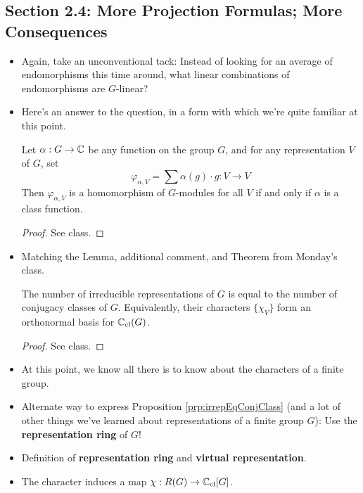 \documentclass[../notes.tex]{subfiles}
\begin{document}
\subsection*{Section 2.4: More Projection Formulas; More Consequences}
\begin{itemize}
    \item Again, \textcite{bib:FultonHarris} take an unconventional tack: Instead of looking for an average of endomorphisms this time around, what linear combinations of endomorphisms are $G$-linear?
    \item Here's an answer to the question, in a form with which we're quite familiar at this point.
    \setcounter{FHlemma}{27}
    \begin{FHproposition}
        Let $\alpha:G\to\mathbb{C}$ be any function on the group $G$, and for any representation $V$ of $G$, set
        \begin{equation*}
            \varphi_{\alpha,V} = \sum\alpha(g)\cdot g:V\to V
        \end{equation*}
        Then $\varphi_{\alpha,V}$ is a homomorphism of $G$-modules for all $V$ if and only if $\alpha$ is a class function.
        \begin{proof}
            See class.
        \end{proof}
    \end{FHproposition}
    \item Matching the Lemma, additional comment, and Theorem from Monday's class.
    \begin{FHproposition}\label{prp:irrepEqConjClass}
        The number of irreducible representations of $G$ is equal to the number of conjugacy classes of $G$. Equivalently, their characters $\{\chi_V\}$ form an orthonormal basis for $\mathbb{C}_\text{cl}(G)$.
        \begin{proof}
            See class.
        \end{proof}
    \end{FHproposition}
    \item At this point, we know all there is to know about the characters of a finite group.
    \item Alternate way to express Proposition \ref{prp:irrepEqConjClass} (and a lot of other things we've learned about representations of a finite group $G$): Use the \textbf{representation ring} of $G$!
    \item Definition of \textbf{representation ring} and \textbf{virtual representation}.
    \item The character induces a map $\chi:R(G)\to\mathbb{C}_\text{cl}[G]$.

\end{itemize}
\end{document}
